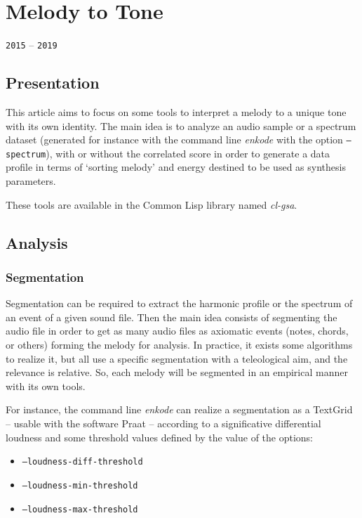 \chapter{Melody to Tone}
\thispagestyle{empty}

\label{m2t}

{\texttt{2015} -- \texttt{2019}}

\bigskip
\smallskip

\section{Presentation}

This article aims to focus on some tools to interpret a melody to a unique tone with its own identity. The main idea is to analyze an audio sample or a spectrum dataset (generated for instance with the command line \textsl{enkode} with the option \texttt{--spectrum}), with or without the correlated score in order to generate a data profile in terms of `sorting melody' and energy destined to be used as synthesis parameters.

These tools are available in the Common Lisp library named \textsl{cl-gsa}.

\section{Analysis}

\subsection{Segmentation}

Segmentation can be required to extract the harmonic profile or the spectrum of an event of a given sound file. Then the main idea consists of segmenting the audio file in order to get as many audio files as axiomatic events (notes, chords, or others) forming the melody for analysis.
In practice, it exists some algorithms to realize it, but all use a specific segmentation with a teleological aim, and the relevance is relative. So, each melody will be segmented in an empirical manner with its own tools.

For instance, the command line \textsl{enkode} can realize a segmentation as a TextGrid -- usable with the software Praat -- according to a significative differential loudness and some threshold values defined by the value of the options:
\begin{itemize}
  \item \texttt{--loudness-diff-threshold}
  \item \texttt{--loudness-min-threshold}
  \item \texttt{--loudness-max-threshold}
\end{itemize}

